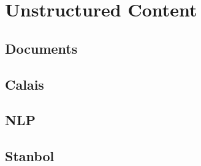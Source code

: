 \chapter{Unstructured Content}

\section{Documents}

\section{Calais}

\section{NLP}

\section{Stanbol}
